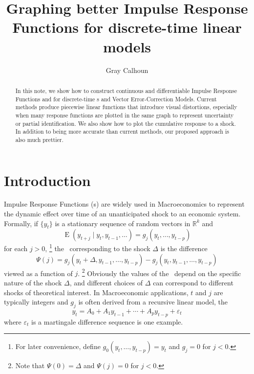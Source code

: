 \documentclass[12pt,fleqn]{article}
\title{Graphing better Impulse Response Functions for discrete-time
  linear models} \author{Gray Calhoun} 
\DeclareMathOperator{\E}{E}
\newcommand{\vep}{\varepsilon}
\newcommand{\RR}{\mathbb{R}}
\begin{document}
\maketitle
\begin{abstract}\noindent%
  In this note, we show how to construct continuous and differentiable
  Impulse Response Functions and for discrete-time \VAR s and Vector
  Error-Correction Models. Current methods produce piecewise linear
  functions that introduce visual distortions, especially when many
  response functions are plotted in the same graph to represent
  uncertainty or partial identification. We also show how to plot the
  cumulative response to a shock. In addition to being more accurate
  than current methods, our proposed approach is also much prettier.
\end{abstract}

\section{Introduction}

Impulse Response Functions (\IRF s) are widely used in Macroeconomics
to represent the dynamic effect over time of an unanticipated shock to
an economic system. Formally, if $\{y_t\}$ is a stationary sequence of
random vectors in $\RR^k$ and
\[
\E(y_{t+j} \mid y_t, y_{t-1},\dots) = g_j(y_t,\dots,y_{t-p})
\]
for each $j > 0$,%
\footnote{For later convenience, define
  $g_0(y_t,\dots,y_{t-p}) = y_t$ and $g_j = 0$ for $j < 0$.} %
the \IRF\ corresponding to the shock $\Delta$ is the difference
\[
\Psi(j) = g_j(y_t + \Delta, y_{t-1},\dots,y_{t-p}) - g_j(y_t, y_{t-1},\dots,y_{t-p})
\]
viewed as a function of $j$.%
\footnote{Note that $\Psi(0) = \Delta$ and $\Psi(j) = 0$ for $j <
  0$.} %
Obviously the values of the \IRF\ depend on the specific nature of the
shock $\Delta$, and different choices of $\Delta$ can correspond to
different shocks of theoretical interest.  In Macroeconomic
applications, $t$ and $j$ are typically integers and $g_j$ is often
derived from a recursive linear model, the \VAR
\begin{equation}\label{eq:1}
  y_t = A_0 + A_1 y_{t-1} + \cdots + A_p y_{t-p} + \vep_t
\end{equation}
where $\vep_t$ is a martingale difference sequence is one example.
\end{document}
